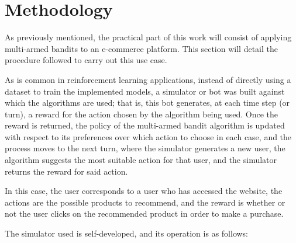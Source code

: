 \documentclass[../main.tex]{subfiles}
\begin{document}
\chapter{Methodology}\label{ch:methodology}

As previously mentioned, the practical part of this work will consist of applying 
multi-armed bandits to an e-commerce platform. This section will detail the procedure 
followed to carry out this use case.  

As is common in reinforcement learning applications, instead of directly using a 
dataset to train the implemented models, a simulator or bot was built against which 
the algorithms are used; that is, this bot generates, at each time step (or turn), 
a reward for the action chosen by the algorithm being used. Once the reward is returned, 
the policy of the multi-armed bandit algorithm is updated with respect to its preferences 
over which action to choose in each case, and the process moves to the next turn, where 
the simulator generates a new user, the algorithm suggests the most suitable action for that 
user, and the simulator returns the reward for said action.  

In this case, the user corresponds to a user who has accessed the website, the actions are 
the possible products to recommend, and the reward is whether or not the user clicks on the 
recommended product in order to make a purchase.  

The simulator used is self-developed, and its operation is as follows:  
\end{document}
